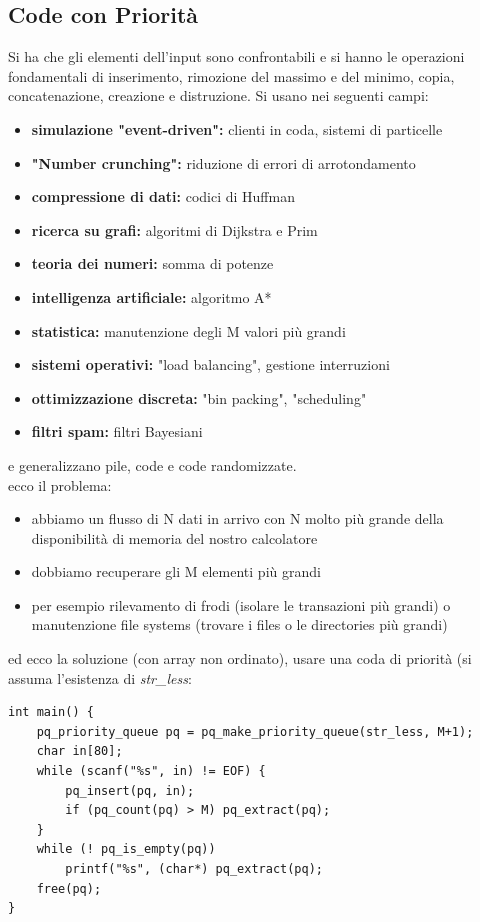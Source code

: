 \documentclass[a4paper,12pt, oneside]{book}
\begin{document}
\subsection{Code con Priorità}
Si ha che gli elementi dell'input sono confrontabili e si hanno le operazioni fondamentali di inserimento, rimozione del massimo e del minimo, copia, concatenazione, creazione e distruzione. Si usano nei seguenti campi:
\begin{itemize}
	\item \textbf{simulazione "event-driven":} clienti in coda, sistemi di particelle
	\item \textbf{"Number crunching":} riduzione di errori di arrotondamento
	\item \textbf{compressione di dati:} codici di Huffman
	\item \textbf{ricerca su grafi:} algoritmi di Dijkstra e Prim
	\item \textbf{teoria dei numeri:} somma di potenze
	\item \textbf{intelligenza artificiale:} algoritmo A*
	\item \textbf{statistica:} manutenzione degli M valori più grandi
	\item \textbf{sistemi operativi:} "load balancing", gestione interruzioni
	\item \textbf{ottimizzazione discreta:} "bin packing", "scheduling"
	\item \textbf{filtri spam:} filtri Bayesiani
\end{itemize}
e generalizzano pile, code e code randomizzate.\\
ecco il problema:
\begin{itemize}
	\item abbiamo un flusso di N dati in arrivo con N molto più grande della
	      disponibilità di memoria del nostro calcolatore
	\item dobbiamo recuperare gli M elementi più grandi
	\item per esempio rilevamento di frodi (isolare le transazioni più grandi) o manutenzione file systems (trovare i files o le directories più grandi)
\end{itemize}
ed ecco la soluzione (con array non ordinato), usare una coda di priorità (si assuma l'esistenza di \textit{str\_less}:
\begin{verbatim}
int main() {
    pq_priority_queue pq = pq_make_priority_queue(str_less, M+1);
    char in[80];
    while (scanf("%s", in) != EOF) {
        pq_insert(pq, in);
        if (pq_count(pq) > M) pq_extract(pq);
    }
    while (! pq_is_empty(pq))
        printf("%s", (char*) pq_extract(pq);
    free(pq);
}
\end{verbatim}
\end{document}
